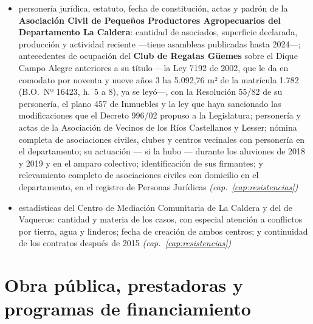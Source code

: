 \begin{itemize}
\item personería jurídica, estatuto, fecha de constitución, actas y padrón de la \textbf{Asociación Civil de Pequeños Productores Agropecuarios del Departamento La Caldera}: cantidad de asociados, superficie declarada, producción y actividad reciente ---tiene asambleas publicadas hasta 2024---; antecedentes de ocupación del \textbf{Club de Regatas Güemes} sobre el Dique Campo Alegre anteriores a su título ---la Ley 7192 de 2002, que le da en comodato por noventa y nueve años 3 ha 5.092,76 m² de la matrícula 1.782 (B.O.\ Nº 16423, h.\ 5 a 8), ya se leyó---, con la Resolución 55/82 de su personería, el plano 457 de Inmuebles y la ley que haya sancionado las modificaciones que el Decreto 996/02 propuso a la Legislatura; personería y actas de la Asociación de Vecinos de los Ríos Castellanos y Lesser; nómina completa de asociaciones civiles, clubes y centros vecinales con personería en el departamento; su actuación --- si la hubo --- durante los aluviones de 2018 y 2019 y en el amparo colectivo; identificación de sus firmantes; y relevamiento completo de asociaciones civiles con domicilio en el departamento, en el registro de Personas Jurídicas \textit{(cap.\ \ref{cap:resistencias})}
\item estadísticas del Centro de Mediación Comunitaria de La Caldera y del de Vaqueros: cantidad y materia de los casos, con especial atención a conflictos por tierra, agua y linderos; fecha de creación de ambos centros; y continuidad de los contratos después de 2015 \textit{(cap.\ \ref{cap:resistencias})}
\end{itemize}

\section{Obra pública, prestadoras y programas de financiamiento}

